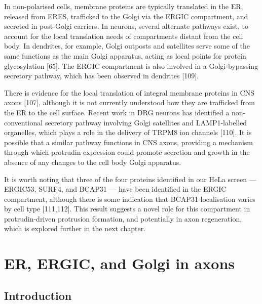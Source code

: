 \documentclass[
  12pt,
  a4paper,
]{book}
\renewcommand{\chaptermark}[1]{\markboth{#1}{}}
\begin{document}
In non-polarised cells, membrane proteins are typically translated in the ER, released from ERES, trafficked to the Golgi via the ERGIC compartment, and secreted in post-Golgi carriers. In neurons, several alternate pathways exist, to account for the local translation needs of compartments distant from the cell body. In dendrites, for example, Golgi outposts and satellites serve some of the same functions as the main Golgi apparatus, acting as local points for protein glycosylation {[}65{]}. The ERGIC compartment is also involved in a Golgi-bypassing secretory pathway, which has been observed in dendrites {[}109{]}.

There is evidence for the local translation of integral membrane proteins in CNS axons {[}107{]}, although it is not currently understood how they are trafficked from the ER to the cell surface. Recent work in DRG neurons has identified a non-conventional secretory pathway involving Golgi satellites and LAMP1-labelled organelles, which plays a role in the delivery of TRPM8 ion channels {[}110{]}. It is possible that a similar pathway functions in CNS axons, providing a mechanism through which protrudin expression could promote secretion and growth in the absence of any changes to the cell body Golgi apparatus.

It is worth noting that three of the four proteins identified in our HeLa screen --- ERGIC53, SURF4, and BCAP31 --- have been identified in the ERGIC compartment, although there is some indication that BCAP31 localisation varies by cell type {[}111,112{]}. This result suggests a novel role for this compartment in protrudin-driven protrusion formation, and potentially in axon regeneration, which is explored further in the next chapter.

\hypertarget{er-ergic-and-golgi-in-axons}{%
\chapter{ER, ERGIC, and Golgi in axons}\label{er-ergic-and-golgi-in-axons}}

\chaptermark{ER, ERGIC, and Golgi}

\hypertarget{introduction-2}{%
\section{Introduction}\label{introduction-2}}
\end{document}
